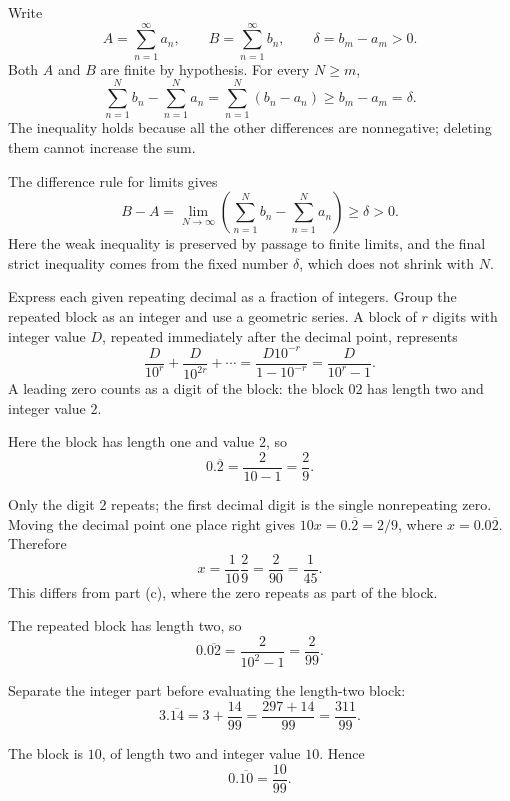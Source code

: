 Write
\[
 A=\sum_{n=1}^{\infty}a_n,\qquad
 B=\sum_{n=1}^{\infty}b_n,\qquad
 \delta=b_m-a_m>0.
\]
Both $A$ and $B$ are finite by hypothesis. For every $N\ge m$,
\[
 \sum_{n=1}^{N}b_n-\sum_{n=1}^{N}a_n
 =\sum_{n=1}^{N}(b_n-a_n)
 \ge b_m-a_m=\delta.
\]
The inequality holds because all the other differences are
nonnegative; deleting them cannot increase the sum.

The difference rule for limits gives
\[
 B-A=\lim_{N\to\infty}
 \left(\sum_{n=1}^{N}b_n-\sum_{n=1}^{N}a_n\right)\ge\delta>0.
\]
Here the weak inequality is preserved by passage to finite limits,
and the final strict inequality comes from the fixed number
$\delta$, which does not shrink with $N$.

\goal Express each given repeating decimal as a fraction of integers.
\idea Group the repeated block as an integer and use a geometric
series. A block of $r$ digits with integer value $D$, repeated
immediately after the decimal point, represents
\[
 \frac{D}{10^r}+\frac{D}{10^{2r}}+\cdots
 =\frac{D10^{-r}}{1-10^{-r}}=\frac{D}{10^r-1}.
\]
A leading zero counts as a digit of the block: the block $02$ has
length two and integer value $2$.

Here the block has length one and value $2$, so
\[
 0.\overline2=\frac2{10-1}=\boxed{\frac29}.
\]

Only the digit $2$ repeats; the first decimal digit is the single
nonrepeating zero. Moving the decimal point one place right gives
$10x=0.\overline2=2/9$, where $x=0.0\overline2$. Therefore
\[
 x=\frac1{10}\frac29=\frac2{90}=\boxed{\frac1{45}}.
\]
This differs from part (c), where the zero repeats as part of the block.

The repeated block has length two, so
\[
 0.\overline{02}=\frac2{10^2-1}=\boxed{\frac2{99}}.
\]

Separate the integer part before evaluating the length-two block:
\[
 3.\overline{14}=3+\frac{14}{99}
 =\frac{297+14}{99}=\boxed{\frac{311}{99}}.
\]

The block is $10$, of length two and integer value $10$. Hence
\[
 0.\overline{10}=\boxed{\frac{10}{99}}.
\]

